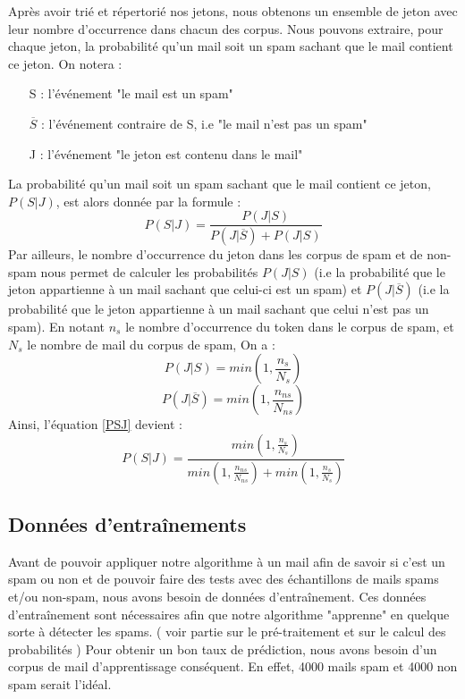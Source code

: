 \documentclass{article}
\begin{document}
Après avoir trié et répertorié nos jetons, nous obtenons un ensemble de jeton avec leur nombre d'occurrence dans chacun des corpus. Nous pouvons extraire, pour chaque jeton, la probabilité qu'un mail soit un spam sachant que le mail contient ce jeton. On notera :

\begin{itemize}
	\item[S] : l'événement "le mail est un spam"
	\item[$\overline{S}$] : l'événement contraire de S, i.e "le mail n'est pas un spam"
	\item[J] : l'événement "le jeton est contenu dans le mail"
\end{itemize}

La probabilité qu'un mail soit un spam sachant que le mail contient ce jeton, $P(S|J)$,  est alors donnée par la formule :
\begin{equation}
P(S|J)=\frac{P(J|S)}{P(J|\overline{S})+P(J|S)}
\label{PSJ}
\end{equation}
Par ailleurs, le nombre d'occurrence du jeton dans les corpus de spam et de non-spam nous permet de calculer les probabilités $P(J|S)$ (i.e la probabilité que le jeton appartienne à un mail sachant que celui-ci est un spam) et $P(J|\overline{S})$ (i.e la probabilité que le jeton appartienne à un mail sachant que celui n'est pas un spam). En notant $n_{s}$ le nombre d'occurrence du token dans le corpus de spam, et $N_{s}$ le nombre de mail du corpus de spam, On a :
\begin{equation}
P(J|S) = min(1,\frac{n_{s}}{N_{s}})
\end{equation}
\begin{equation}
P(J|\overline{S}) =min(1,\frac{n_{ns}}{N_{ns}})
\end{equation}
Ainsi, l'équation \ref{PSJ} devient :
\begin{equation}
P(S|J) = \frac{min(1,\frac{n_{s}}{N_{s}})}{ min(1,\frac{n_{ns}}{N_{ns}})+min(1,\frac{n_{s}}{N_{s}})}
\end{equation}

\subsection{Données d’entraînements}

Avant de pouvoir appliquer notre algorithme à un mail afin de savoir si c'est un spam ou non et de pouvoir faire des tests avec des échantillons de mails spams et/ou non-spam, 
nous avons besoin de données d'entraînement. Ces données d'entraînement sont nécessaires afin que notre algorithme "apprenne" en quelque sorte à détecter les spams. ( voir partie sur le pré-traitement et sur le calcul des probabilités ) 
Pour obtenir un bon taux de prédiction, nous avons besoin d'un corpus de mail d'apprentissage conséquent. En effet, 4000 mails spam et 4000 non spam serait l'idéal.
\end{document}
